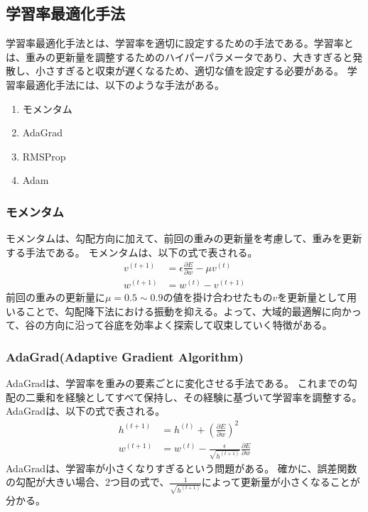 \documentclass{ltjsarticle}
\begin{document}
\subsection{学習率最適化手法}
学習率最適化手法とは、学習率を適切に設定するための手法である。学習率とは、重みの更新量を調整するためのハイパーパラメータであり、大きすぎると発散し、小さすぎると収束が遅くなるため、適切な値を設定する必要がある。
学習率最適化手法には、以下のような手法がある。
\begin{enumerate}
  \item モメンタム
  \item AdaGrad
  \item RMSProp
  \item Adam
\end{enumerate}

\subsubsection{モメンタム}
モメンタムは、勾配方向に加えて、前回の重みの更新量を考慮して、重みを更新する手法である。
モメンタムは、以下の式で表される。
\begin{align}
  v^{(t+1)} &= \epsilon \frac{\partial E}{\partial w} - \mu v^{(t)} \\
  w^{(t+1)} &= w^{(t)} - v^{(t+1)}
\end{align}
前回の重みの更新量に$\mu = 0.5 \sim 0.9$の値を掛け合わせたもの$v$を更新量として用いることで、勾配降下法における振動を抑える。よって、大域的最適解に向かって、谷の方向に沿って谷底を効率よく探索して収束していく特徴がある。

\subsubsection{AdaGrad(Adaptive Gradient Algorithm)}
AdaGradは、学習率を重みの要素ごとに変化させる手法である。
これまでの勾配の二乗和を経験としてすべて保持し、その経験に基づいて学習率を調整する。
AdaGradは、以下の式で表される。
\begin{align}
  h^{(t+1)} &= h^{(t)} + \left( \frac{\partial E}{\partial w} \right)^2 \\
  w^{(t+1)} &= w^{(t)} - \frac{\epsilon}{\sqrt{h^{(t+1)}}} \frac{\partial E}{\partial w}
\end{align}
AdaGradは、学習率が小さくなりすぎるという問題がある。
確かに、誤差関数の勾配が大きい場合、2つ目の式で、$\frac{1}{\sqrt{h^{(t+1)}}}$によって更新量が小さくなることが分かる。
\end{document}
